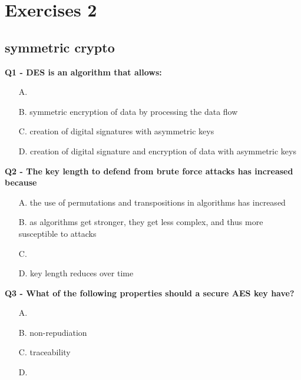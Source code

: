 \chapter{Exercises 2}

\section{symmetric crypto}

\textbf{Q1 - DES is an algorithm that allows:}
\begin{enumerate}
    \item[A.] 
    \item[B.] symmetric encryption of data by processing the data flow
    \item[C.] creation of digital signatures with asymmetric keys
    \item[D.] creation of digital signature and encryption of data with asymmetric keys
\end{enumerate}

\textbf{Q2 - The key length to defend from brute force attacks has increased because}
\begin{enumerate}
    \item[A.] the use of permutations and transpositions in algorithms has increased
    \item[B.] as algorithms get stronger, they get less complex, and thus more susceptible to attacks
    \item[C.] 
    \item[D.] key length reduces over time
\end{enumerate}

\textbf{Q3 - What of the following properties should a secure AES key have?}
\begin{enumerate}
    \item[A.] 
    \item[B.] non-repudiation
    \item[C.] traceability
    \item[D.] 
\end{enumerate}

